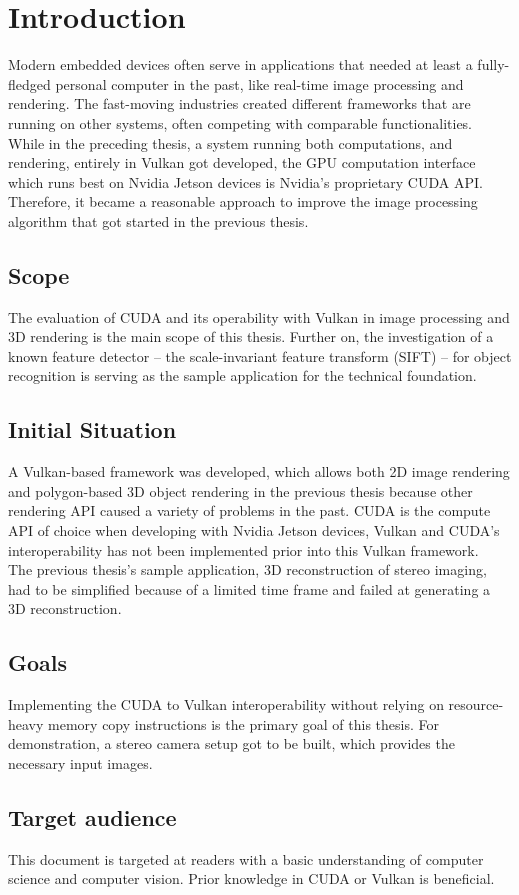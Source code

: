 \chapter{Introduction}
\label{sec:Introduction}
Modern embedded devices often serve in applications that needed at least a fully-fledged personal computer in the past, like real-time image processing and rendering. The fast-moving industries created different frameworks that are running on other systems, often competing with comparable functionalities. 
While in the preceding thesis, a system running both computations, and rendering, entirely in Vulkan got developed, the GPU computation interface which runs best on Nvidia Jetson devices is Nvidia's proprietary CUDA API. Therefore, it became a reasonable approach to improve the image processing algorithm that got started in the previous thesis. 
\section{Scope}
\label{sec:Scope}
The evaluation of CUDA and its operability with Vulkan in image processing and 3D rendering is the main scope of this thesis. Further on, the investigation of a known feature detector – the scale-invariant feature transform (SIFT) – for object recognition is serving as the sample application for the technical foundation. 
\section{Initial Situation}
\label{sec:Situation}
A Vulkan-based framework was developed, which allows both 2D image rendering and polygon-based 3D object rendering in the previous thesis because other rendering API caused a variety of problems in the past. CUDA is the compute API of choice when developing with Nvidia Jetson devices, Vulkan and CUDA's interoperability has not been implemented prior into this Vulkan framework.\\
The previous thesis's sample application, 3D reconstruction of stereo imaging, had to be simplified because of a limited time frame and failed at generating a 3D reconstruction. 
\section{Goals}
\label{sec:Goals}
Implementing the CUDA to Vulkan interoperability without relying on resource-heavy memory copy instructions is the primary goal of this thesis. For demonstration, a stereo camera setup got to be built, which provides the necessary input images. 
\section{Target audience}
\label{sec:Ziel}
This document is targeted at readers with a basic understanding of computer science and computer vision. Prior knowledge in CUDA or Vulkan is beneficial.
